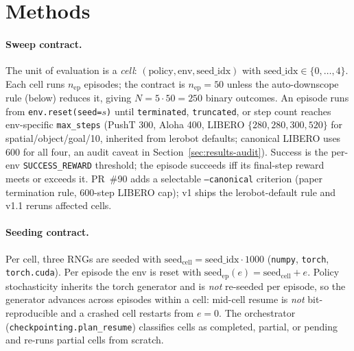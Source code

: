 \documentclass[10pt]{article}
\begin{document}
\section{Methods}
\label{sec:methods}

\paragraph{Sweep contract.}
The unit of evaluation is a \textit{cell}:
$(\text{policy}, \text{env}, \text{seed\_idx})$ with
$\text{seed\_idx} \in \{0,\ldots,4\}$. Each cell runs $n_\text{ep}$
episodes; the contract is $n_\text{ep}{=}50$ unless the auto-downscope
rule (below) reduces it, giving $N = 5 \cdot 50 = 250$ binary outcomes.
An episode runs from \texttt{env.reset(seed=$s$)} until
\texttt{terminated}, \texttt{truncated}, or step count reaches
env-specific \texttt{max\_steps} (PushT 300, Aloha 400, LIBERO
$\{280,280,300,520\}$ for spatial/object/goal/10, inherited from
lerobot defaults; canonical LIBERO uses 600 for all four, an audit
caveat in Section~\ref{sec:results-audit}). Success is the per-env
\texttt{SUCCESS\_REWARD} threshold; the episode succeeds iff its
final-step reward meets or exceeds it. PR~\#90 adds a selectable
\texttt{--canonical} criterion (paper termination rule, 600-step LIBERO
cap); v1 ships the lerobot-default rule and v1.1 reruns affected cells.

\paragraph{Seeding contract.}
Per cell, three RNGs are seeded with
$\text{seed}_\text{cell} = \text{seed\_idx} \cdot 1000$
(\texttt{numpy}, \texttt{torch}, \texttt{torch.cuda}). Per episode the
env is reset with $\text{seed}_\text{ep}(e) = \text{seed}_\text{cell}+e$.
Policy stochasticity inherits the torch generator and is \emph{not}
re-seeded per episode, so the generator advances across episodes within
a cell: mid-cell resume is \emph{not} bit-reproducible and a crashed
cell restarts from $e{=}0$. The orchestrator
(\texttt{checkpointing.plan\_resume}) classifies cells as completed,
partial, or pending and re-runs partial cells from scratch.
\end{document}
